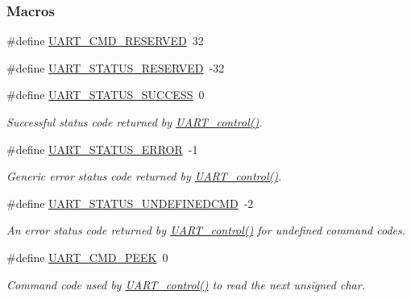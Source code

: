 \subsubsection*{Macros}
\begin{DoxyCompactItemize}
\item 
\#define \hyperlink{group___u_a_r_t___c_o_n_t_r_o_l_ga0f5a809e0884da33fef102236eb51644}{U\+A\+R\+T\+\_\+\+C\+M\+D\+\_\+\+R\+E\+S\+E\+R\+V\+E\+D}~32
\item 
\#define \hyperlink{group___u_a_r_t___c_o_n_t_r_o_l_ga8f35027907fbab6a9ee302d2ee52a879}{U\+A\+R\+T\+\_\+\+S\+T\+A\+T\+U\+S\+\_\+\+R\+E\+S\+E\+R\+V\+E\+D}~-\/32
\item 
\#define \hyperlink{group___u_a_r_t___s_t_a_t_u_s_ga101b7761f89b3ec49f0c6726669acfed}{U\+A\+R\+T\+\_\+\+S\+T\+A\+T\+U\+S\+\_\+\+S\+U\+C\+C\+E\+S\+S}~0
\begin{DoxyCompactList}\small\item\em Successful status code returned by \hyperlink{_u_a_r_t_8h_a9de3c26cfe4ce6b7f350a6ea6e16801d}{U\+A\+R\+T\+\_\+control()}. \end{DoxyCompactList}\item 
\#define \hyperlink{group___u_a_r_t___s_t_a_t_u_s_ga2ae076f4aae13ca8e2aea674207df0ad}{U\+A\+R\+T\+\_\+\+S\+T\+A\+T\+U\+S\+\_\+\+E\+R\+R\+O\+R}~-\/1
\begin{DoxyCompactList}\small\item\em Generic error status code returned by \hyperlink{_u_a_r_t_8h_a9de3c26cfe4ce6b7f350a6ea6e16801d}{U\+A\+R\+T\+\_\+control()}. \end{DoxyCompactList}\item 
\#define \hyperlink{group___u_a_r_t___s_t_a_t_u_s_ga61125a2eb8059fd8b96ad95edc68ac2b}{U\+A\+R\+T\+\_\+\+S\+T\+A\+T\+U\+S\+\_\+\+U\+N\+D\+E\+F\+I\+N\+E\+D\+C\+M\+D}~-\/2
\begin{DoxyCompactList}\small\item\em An error status code returned by \hyperlink{_u_a_r_t_8h_a9de3c26cfe4ce6b7f350a6ea6e16801d}{U\+A\+R\+T\+\_\+control()} for undefined command codes. \end{DoxyCompactList}\item 
\#define \hyperlink{group___u_a_r_t___c_m_d_ga942596a37cb2109ae021f88f3d907bdc}{U\+A\+R\+T\+\_\+\+C\+M\+D\+\_\+\+P\+E\+E\+K}~0
\begin{DoxyCompactList}\small\item\em Command code used by \hyperlink{_u_a_r_t_8h_a9de3c26cfe4ce6b7f350a6ea6e16801d}{U\+A\+R\+T\+\_\+control()} to read the next unsigned char. \end{DoxyCompactList}\item 

\end{DoxyCompactItemize}
